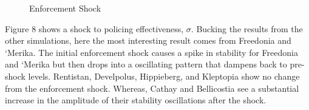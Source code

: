 \documentclass[12pt]{article}
\begin{document}
\begin{spacing}{1.5}
\begin{figure}
\centering
{} 
\caption{Enforcement Shock}

\end{figure}

Figure 8 shows a shock to policing effectiveness, $\sigma$. Bucking the results from the other simulations, here the most interesting result comes from Freedonia and `Merika. The initial enforcement shock causes a spike in stability for Freedonia and `Merika but then drops into a oscillating pattern that dampens back to pre-shock levels. Rentistan, Develpolus, Hippieberg, and Kleptopia show no change from the enforcement shock. Whereas, Cathay and Bellicostia see a substantial increase in the amplitude of their stability oscillations after the shock.  


\end{spacing}
\end{document}
